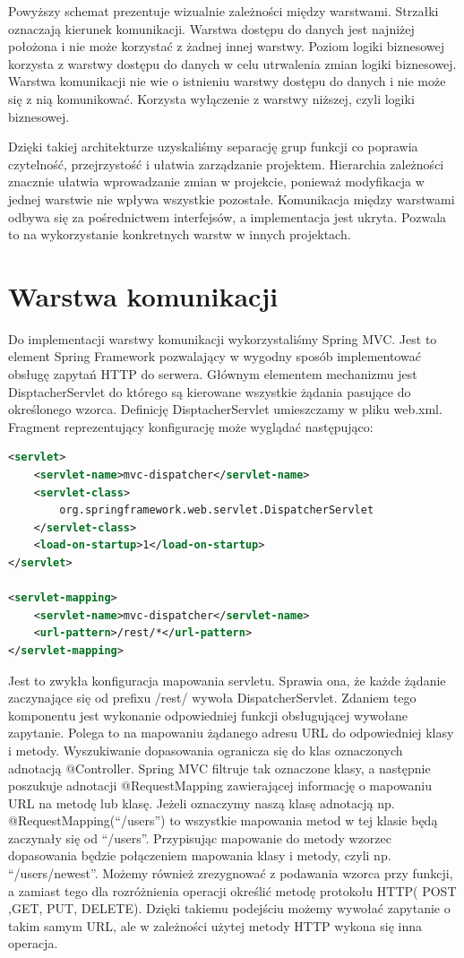Powyższy schemat prezentuje wizualnie zależności między warstwami. Strzałki oznaczają kierunek komunikacji. Warstwa dostępu do danych jest najniżej położona i nie może korzystać z żadnej innej warstwy. Poziom logiki biznesowej korzysta z warstwy dostępu do danych w celu utrwalenia zmian logiki biznesowej. Warstwa komunikacji nie wie o istnieniu warstwy dostępu do danych i nie może się z nią komunikować. Korzysta wyłączenie z warstwy niższej, czyli logiki biznesowej.

Dzięki takiej architekturze uzyskaliśmy separację grup funkcji co poprawia czytelność, przejrzystość i ułatwia zarządzanie projektem. Hierarchia zależności znacznie ułatwia wprowadzanie zmian w projekcie, ponieważ modyfikacja w jednej warstwie nie wpływa wszystkie pozostałe. Komunikacja między warstwami odbywa się za pośrednictwem interfejsów, a implementacja jest ukryta. Pozwala to na wykorzystanie konkretnych warstw w innych projektach.


\section{Warstwa komunikacji}

Do implementacji warstwy komunikacji wykorzystaliśmy Spring MVC. Jest to element Spring Framework pozwalający w wygodny sposób implementować obsługę zapytań HTTP do serwera. Głównym elementem mechanizmu jest DisptacherServlet do którego są kierowane wszystkie żądania pasujące do określonego wzorca. Definicję DisptacherServlet umieszczamy w pliku web.xml. Fragment reprezentujący konfigurację może wyglądać następująco:

\begin{lstlisting}[language=XML,caption=Konfiguracja DispatcherServlet]
<servlet>
	<servlet-name>mvc-dispatcher</servlet-name>
	<servlet-class>
		org.springframework.web.servlet.DispatcherServlet
	</servlet-class>
	<load-on-startup>1</load-on-startup>
</servlet>

<servlet-mapping>
	<servlet-name>mvc-dispatcher</servlet-name>
	<url-pattern>/rest/*</url-pattern>
</servlet-mapping>
\end{lstlisting}


Jest to zwykła konfiguracja mapowania servletu. Sprawia ona, że każde żądanie zaczynające się od prefixu /rest/ wywoła DispatcherServlet. Zdaniem tego komponentu jest wykonanie odpowiedniej funkcji obsługującej wywołane zapytanie. Polega to na mapowaniu żądanego adresu URL do odpowiedniej klasy i metody. Wyszukiwanie dopasowania ogranicza się do klas oznaczonych adnotacją @Controller. Spring MVC filtruje tak oznaczone klasy, a następnie poszukuje adnotacji @RequestMapping zawierającej informację o mapowaniu URL na metodę lub klasę. Jeżeli oznaczymy naszą klasę adnotacją np. @RequestMapping(“/users”) to wszystkie mapowania metod w tej klasie będą zaczynały się od “/users”. Przypisując mapowanie do metody wzorzec dopasowania będzie połączeniem mapowania klasy i metody, czyli np. “/users/newest”. Możemy również zrezygnować z podawania wzorca przy funkcji, a zamiast tego dla rozróżnienia operacji określić metodę protokołu HTTP( POST ,GET, PUT, DELETE). Dzięki takiemu podejściu możemy wywołać zapytanie o takim samym URL, ale w zależności użytej metody HTTP wykona się inna operacja. 

